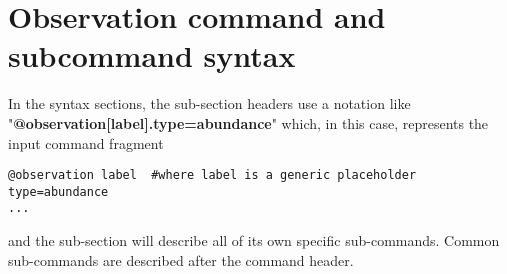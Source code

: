 \subsection{\label{sec:estimation-syntax-MCMC}}


\subsection{}


\subsection{}


\subsection{}


\subsection{}



\subsection{}



\section{Observation command and subcommand syntax\label{sec:observation-syntax}}


In the syntax sections, the sub-section headers use a notation like "\textbf {@observation[label].type=abundance}" which, in this case, represents the input command fragment
{\small{\begin{verbatim}
@observation label  #where label is a generic placeholder
type=abundance
...
\end{verbatim}}}
and the sub-section will describe all of its own specific sub-commands. Common sub-commands are described after the command header.


